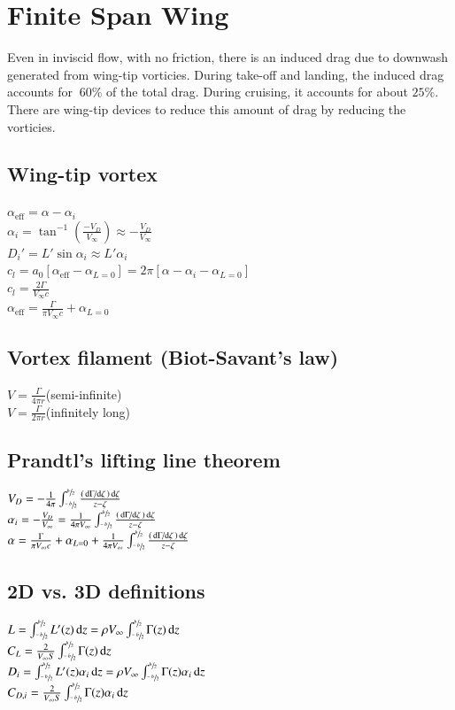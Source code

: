 \section{Finite Span Wing}
Even in inviscid flow, with no friction, there is an induced drag due to downwash generated from wing-tip vorticies. During take-off and landing, the induced drag accounts for $~60\%$ of the total drag. During cruising, it accounts for about $25\%$. There are wing-tip devices to reduce this amount of drag by reducing the vorticies.
\subsection*{Wing-tip vortex}
$\alpha_\text{eff}=\alpha-\alpha_i$\\
$\alpha_i=\tan^{-1}\left(\frac{-V_D}{V_\infty}\right)\approx-\frac{V_D}{V_\infty}$\\
$D_i'=L'\sin\alpha_i\approx L'\alpha_i$\\
$c_l=a_0\left[\alpha_\text{eff}-\alpha_{L=0}\right]=2\pi\left[\alpha-\alpha_i-\alpha_{L=0}\right]$\\
$c_l=\frac{2\Gamma}{V_\infty c}$\\
$\alpha_\text{eff}=\frac{\Gamma}{\pi V_\infty c}+\alpha_{L=0}$
\subsection*{Vortex filament (Biot-Savant's law)}
$V=\frac{\Gamma}{4\pi r}$\hfill(semi-infinite)\\
$V=\frac{\Gamma}{2\pi r}$\hfill(infinitely long)
\subsection*{Prandtl's lifting line theorem}
$V_D=-\frac{1}{4\pi}\intoverspan\frac{\left(\odv{\Gamma}/{\zeta}\right)\odif{\zeta}}{z-\zeta}$\\
$\alpha_i=-\frac{V_D}{V_\infty}=\frac{1}{4\pi V_\infty}\intoverspan\frac{\left(\odv{\Gamma}/{\zeta}\right)\odif{\zeta}}{z-\zeta}$\\
$\alpha=\frac{\Gamma}{\pi V_\infty c}+\alpha_{L=0}+\frac{1}{4\pi V_\infty}\intoverspan\frac{\left(\odv{\Gamma}/{\zeta}\right)\odif{\zeta}}{z-\zeta}$
\subsection*{2D vs. 3D definitions}
$L=\intoverspan L'(z)\odif{z}=\rho V_\infty\intoverspan \Gamma(z)\odif{z}$\\
$C_L=\frac{2}{V_\infty S}\intoverspan\Gamma(z)\odif{z}$\\
$D_i=\intoverspan L'(z)\alpha_i\odif{z}=\rho V_\infty\intoverspan \Gamma(z)\alpha_i\odif{z}$\\
$C_{D,i}=\frac{2}{V_\infty S}\intoverspan \Gamma(z)\alpha_i\odif{z}$
